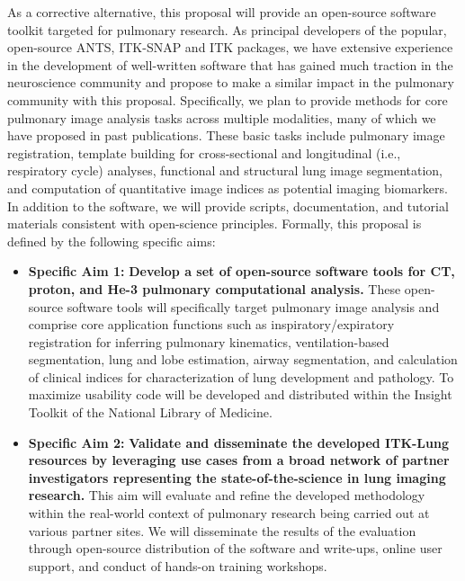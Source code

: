\documentclass[11pt,]{article}
\begin{document}
As a corrective alternative, this proposal will provide an open-source
software toolkit targeted for pulmonary research. As principal
developers of the popular, open-source ANTS, ITK-SNAP and ITK packages,
we have extensive experience in the development of well-written software
that has gained much traction in the neuroscience community and propose
to make a similar impact in the pulmonary community with this proposal.
Specifically, we plan to provide methods for core pulmonary image
analysis tasks across multiple modalities, many of which we have
proposed in past publications. These basic tasks include pulmonary image
registration, template building for cross-sectional and longitudinal
(i.e., respiratory cycle) analyses, functional and structural lung image
segmentation, and computation of quantitative image indices as potential
imaging biomarkers. In addition to the software, we will provide
scripts, documentation, and tutorial materials consistent with
open-science principles. Formally, this proposal is defined by the
following specific aims:

\begin{itemize}
\itemsep1pt\parskip0pt
\item
  \textbf{Specific Aim 1:} \textbf{Develop a set of open-source software
  tools for CT, proton, and He-3 pulmonary computational analysis.}
  These open-source software tools will specifically target pulmonary
  image analysis and comprise core application functions such as
  inspiratory/expiratory registration for inferring pulmonary
  kinematics, ventilation-based segmentation, lung and lobe estimation,
  airway segmentation, and calculation of clinical indices for
  characterization of lung development and pathology. To maximize
  usability code will be developed and distributed within the Insight
  Toolkit of the National Library of Medicine.
\item
  \textbf{Specific Aim 2:} \textbf{Validate and disseminate the
  developed ITK-Lung resources by leveraging use cases from a broad
  network of partner investigators representing the state-of-the-science
  in lung imaging research.} This aim will evaluate and refine the
  developed methodology within the real-world context of pulmonary
  research being carried out at various partner sites. We will
  disseminate the results of the evaluation through open-source
  distribution of the software and write-ups, online user support, and
  conduct of hands-on training workshops.
\end{itemize}
\end{document}
